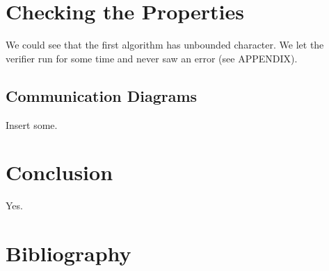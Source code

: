 \documentclass{llncs}
\begin{document}
\section{Checking the Properties}

We could see that the first algorithm has unbounded character. We let the verifier run for some time
and never saw an error (see APPENDIX).

\subsection{Communication Diagrams}

Insert some.

\section{Conclusion}

Yes.

\section{Bibliography}


\end{document}
